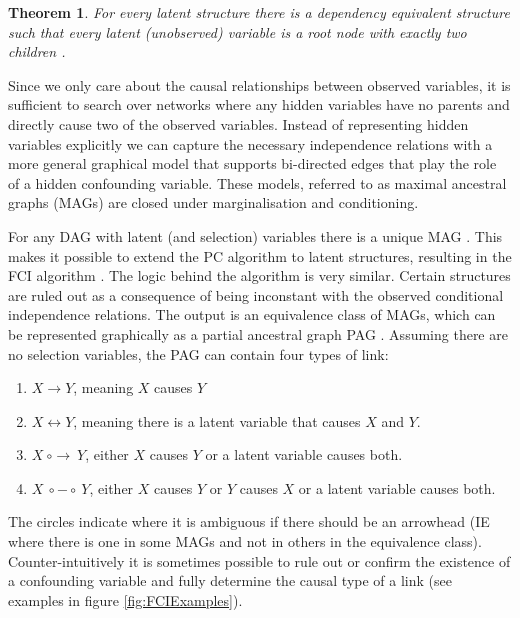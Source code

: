 \documentclass[11pt,a4paper,oneside]{book}
\theoremstyle{plain}
\newtheorem{theorem}{Theorem}
\theoremstyle{definition}
\begin{document}
\begin{theorem}
\citet{Verma1993} For every latent structure there is a dependency equivalent structure such that every latent (unobserved) variable is a root node with exactly two children .
\end{theorem}

Since we only care about the causal relationships between observed variables, it is sufficient to search over networks where any hidden variables have no parents and directly cause two of the observed variables. Instead of representing hidden variables explicitly we can capture the necessary independence relations with a more general graphical model that supports bi-directed edges that play the role of a hidden confounding variable. These models, referred to as maximal ancestral graphs (MAGs) are closed under marginalisation and conditioning. 

For any DAG with latent (and selection) variables there is a unique MAG \citep{Richardson2002}. This makes it possible to extend the PC algorithm to latent structures, resulting in the FCI algorithm \citep{Sprites2000}. The logic behind the algorithm is very similar. Certain structures are ruled out as a consequence of being inconstant with the observed conditional independence relations. The output is an equivalence class of MAGs, which can be represented graphically as a partial ancestral graph PAG \citep{Spirtes1995}. Assuming there are no selection variables, the PAG can contain four types of link:

\begin{enumerate}
\item $X \rightarrow Y$, meaning $X$ causes $Y$
\item $X \leftrightarrow Y$, meaning there is a latent variable that causes $X$ and $Y$.
\item $X\ {\circ} {\rightarrow}\ Y$, either $X$ causes $Y$ or a latent variable causes both.
\item $X\ {\circ} {-}  {\circ}\ Y$, either $X$ causes $Y$ or $Y$ causes $X$ or a latent variable causes both.
\end{enumerate}

The circles indicate where it is ambiguous if there should be an arrowhead (IE where there is one in some MAGs and not in others in the equivalence class). Counter-intuitively it is sometimes possible to  rule out or confirm the existence of a confounding variable and fully determine the causal type of a link (see examples in figure \ref{fig:FCIExamples}). 
\end{document}
